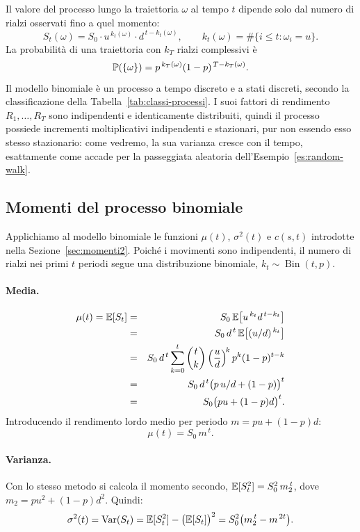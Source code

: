 Il valore del processo lungo la traiettoria $\omega$ al tempo $t$
dipende solo dal numero di rialzi osservati fino a quel momento:
\[
S_t(\omega)=S_0\cdot u^{\,k_t(\omega)}\cdot d^{\,t-k_t(\omega)},
\qquad k_t(\omega)=\#\{i\leq t:\omega_i=u\}.
\]
La probabilit\`{a} di una traiettoria con $k_T$ rialzi complessivi
\`{e}
\[
\mathbb{P}(\{\omega\})=p^{\,k_T(\omega)}(1-p)^{\,T-k_T(\omega)}.
\]
Il modello binomiale \`{e} un processo a tempo discreto e a stati
discreti, secondo la classificazione della
Tabella~\ref{tab:classi-processi}. I suoi fattori di rendimento
$R_1,\ldots,R_T$ sono indipendenti e identicamente distribuiti,
quindi il processo possiede incrementi moltiplicativi indipendenti
e stazionari, pur non essendo esso stesso stazionario: come vedremo,
la sua varianza cresce con il tempo, esattamente come accade per la
passeggiata aleatoria dell'Esempio~\ref{es:random-walk}.

\subsection{Momenti del processo binomiale}

\noindent
Applichiamo al modello binomiale le funzioni $\mu(t)$, $\sigma^2(t)$
e $c(s,t)$ introdotte nella Sezione~\ref{sec:momenti2}. Poich\'{e} i
movimenti sono indipendenti, il numero di rialzi nei primi $t$ periodi
segue una distribuzione binomiale, $k_t\sim\operatorname{Bin}(t,p)$.

\paragraph{Media.}
\begin{eqnarray*}
\mu(t)=\mathbb{E}[S_t]
&=& S_0\,\mathbb{E}\bigl[u^{\,k_t}d^{\,t-k_t}\bigr]\\
&=& S_0\,d^{\,t}\,\mathbb{E}\bigl[(u/d)^{\,k_t}\bigr]\\
&=& S_0\,d^{\,t}\sum_{k=0}^{t}\binom{t}{k}
    \left(\frac{u}{d}\right)^{\!k}p^k(1-p)^{t-k}\\
&=& S_0\,d^{\,t}\bigl(p\,u/d+(1-p)\bigr)^t\\
&=& S_0\bigl(pu+(1-p)d\bigr)^t.
\end{eqnarray*}
Introducendo il rendimento lordo medio per periodo $m=pu+(1-p)d$:
\[
\mu(t)=S_0\,m^{\,t}.
\]

\paragraph{Varianza.}
Con lo stesso metodo si calcola il momento secondo,
$\mathbb{E}[S_t^2]=S_0^2\,m_2^{\,t}$, dove $m_2=pu^2+(1-p)d^2$. Quindi:
\[
\sigma^2(t)=\operatorname{Var}(S_t)=\mathbb{E}[S_t^2]-\bigl(\mathbb{E}[S_t]\bigr)^2
=S_0^2\bigl(m_2^{\,t}-m^{\,2t}\bigr).
\]

